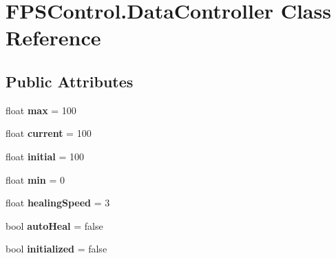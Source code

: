 \hypertarget{class_f_p_s_control_1_1_data_controller}{\section{F\-P\-S\-Control.\-Data\-Controller Class Reference}
\label{class_f_p_s_control_1_1_data_controller}
}
\subsection*{Public Attributes}
\begin{DoxyCompactItemize}
\item 
\hypertarget{class_f_p_s_control_1_1_data_controller_a36f2640348c019b4c4867439db209ca5}{float {\bfseries max} = 100}\label{class_f_p_s_control_1_1_data_controller_a36f2640348c019b4c4867439db209ca5}

\item 
\hypertarget{class_f_p_s_control_1_1_data_controller_a8e91f848781413dc44892e9f5fe7da4f}{float {\bfseries current} = 100}\label{class_f_p_s_control_1_1_data_controller_a8e91f848781413dc44892e9f5fe7da4f}

\item 
\hypertarget{class_f_p_s_control_1_1_data_controller_a104b2d6f755887360b9ba7710cc93f09}{float {\bfseries initial} = 100}\label{class_f_p_s_control_1_1_data_controller_a104b2d6f755887360b9ba7710cc93f09}

\item 
\hypertarget{class_f_p_s_control_1_1_data_controller_aa6c3a3199985a02f1612f487f4f96208}{float {\bfseries min} = 0}\label{class_f_p_s_control_1_1_data_controller_aa6c3a3199985a02f1612f487f4f96208}

\item 
\hypertarget{class_f_p_s_control_1_1_data_controller_a556628c8dc38ac9f07bf6d746a60647d}{float {\bfseries healing\-Speed} = 3}\label{class_f_p_s_control_1_1_data_controller_a556628c8dc38ac9f07bf6d746a60647d}

\item 
\hypertarget{class_f_p_s_control_1_1_data_controller_a83e123ecf4f87192bcc56eee5785a3d1}{bool {\bfseries auto\-Heal} = false}\label{class_f_p_s_control_1_1_data_controller_a83e123ecf4f87192bcc56eee5785a3d1}

\item 
\hypertarget{class_f_p_s_control_1_1_data_controller_a0ae05849bacd4ac9ce20281dc4200276}{bool {\bfseries initialized} = false}\label{class_f_p_s_control_1_1_data_controller_a0ae05849bacd4ac9ce20281dc4200276}

\end{DoxyCompactItemize}
